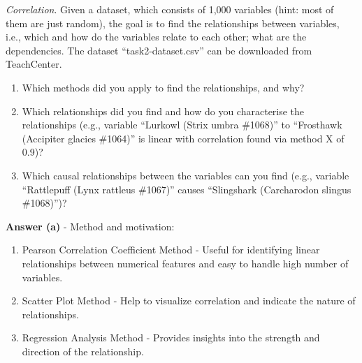 \documentclass[a4paper,10pt]{article}\setlength{\textheight}{10in}\setlength{\textwidth}{6.5in}\setlength{\topmargin}{-0.125in}\setlength{\oddsidemargin}{-.2in}\setlength{\evensidemargin}{-.2in}\setlength{\headsep}{0.2in}\setlength{\footskip}{0pt}\usepackage{amsmath}\usepackage{fancyhdr}\usepackage{enumitem}\usepackage{hyperref}\usepackage{xcolor}\usepackage{graphicx}\usepackage[export]{adjustbox}\usepackage{caption}\usepackage{float}\usepackage{booktabs}\usepackage{makecell}\pagestyle{fancy}
\begin{document}
\begin{enumerate}[topsep=0mm, partopsep=0mm, leftmargin=*]
\clearpage
{\color{blue}
\newpage\item\textit{Correlation}. Given a dataset, which consists of 1,000 variables (hint: most of them are just random), the goal is to find the relationships between variables, i.e., which and how do the variables relate to each other; what are the dependencies.
The dataset ``task2-dataset.csv'' can be downloaded from TeachCenter.
\begin{enumerate}
	\item Which methods did you apply to find the relationships, and why?
	\item Which relationships did you find and how do you characterise the relationships (e.g., variable ``Lurkowl (Strix umbra \#1068)'' to ``Frosthawk (Accipiter glacies \#1064)'' is linear with correlation found via method X of 0.9)?
	\item Which causal relationships between the variables can you find (e.g., variable ``Rattlepuff (Lynx rattleus \#1067)'' causes ``Slingshark (Carcharodon slingus \#1068)'')?
\end{enumerate}
}

\textbf{Answer (a)} - Method and motivation:
    \begin{enumerate}
        \item Pearson Correlation Coefficient Method - Useful for identifying linear relationships between numerical features and easy to handle high number of variables.
        \item Scatter Plot Method - Help to visualize correlation and indicate the nature of relationships.
        \item Regression Analysis Method - Provides insights into the strength and direction of the relationship.
    \end{enumerate}


\end{enumerate}
\end{document}
